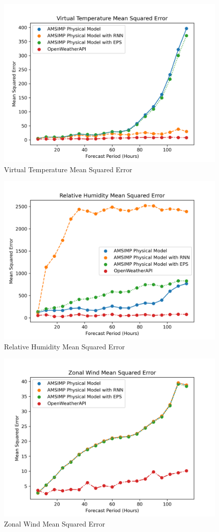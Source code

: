 \begin{figure}[H]
    \centering
    \includegraphics[width=.8\linewidth]{Graphs/accuracy/comparsion_openweatherapi/virtual_temperature.png}
    \caption{Virtual Temperature Mean Squared Error}
\end{figure}

\begin{figure}[H]
    \centering
    \includegraphics[width=.8\linewidth]{Graphs/accuracy/comparsion_openweatherapi/relative_humidity.png}
    \caption{Relative Humidity Mean Squared Error}
\end{figure}

\begin{figure}[H]
    \centering
    \includegraphics[width=.8\linewidth]{Graphs/accuracy/comparsion_openweatherapi/zonal_wind.png}
    \caption{Zonal Wind Mean Squared Error}
\end{figure}

